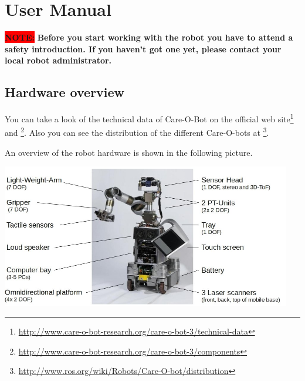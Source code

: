 \chapter{User Manual}
\label{chap:user}    

{\colorbox{red}{\textbf{NOTE:}}}\textbf{ Before you start working with the robot you have to attend a safety introduction. If you haven't got one yet, please contact your local robot administrator.}

\section{Hardware overview}
You can take a look of the technical data of Care-O-Bot on the official web site\footnote{\url{http://www.care-o-bot-research.org/care-o-bot-3/technical-data}} and \footnote{\url{http://www.care-o-bot-research.org/care-o-bot-3/components}}. Also you can see the distribution of the different Care-O-bots at \footnote{\url{http://www.ros.org/wiki/Robots/Care-O-bot/distribution}}.

An overview of the robot hardware is shown in the following picture.
\begin{center}
 \includegraphics[width=0.95\textwidth]{images/hardware_overview.jpg}
\end{center}

